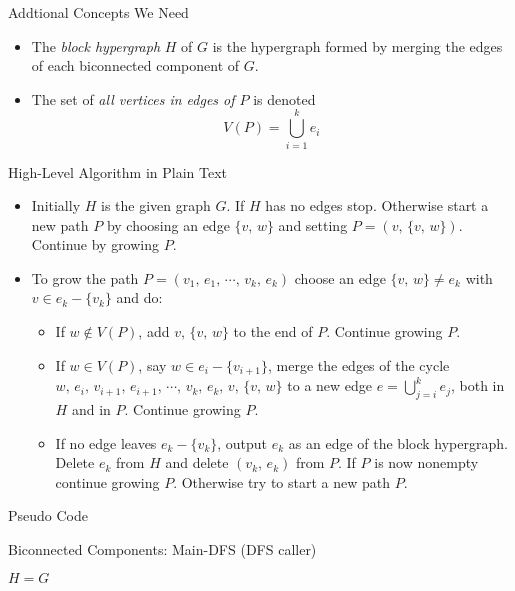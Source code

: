 \documentclass{beamer}
\begin{document}
\begin{frame}{Addtional Concepts We Need}
	\begin{itemize}
		\item
		The \emph{block hypergraph} $H$ of $G$ is the hypergraph formed by merging the edges of each biconnected component of $G$.
		\item
		The set of \emph{all vertices in edges of $P$} is denoted
		$$V(P)=\bigcup_{i=1}^ke_i$$
	\end{itemize}
\end{frame}

\begin{frame}{High-Level Algorithm in Plain Text}
	\begin{itemize}
		\item
		Initially $H$ is the given graph $G$. If $H$ has no edges stop. Otherwise start a new path $P$ by choosing an edge 
		$\{v,\,w\}$ and setting $P=(v,\,\{v,\,w\})$. Continue by growing $P$.
		\item
		To grow the path $P=(v_1,\,e_1,\,\cdots,\,v_k,\,e_k)$ choose an edge $\{v,\,w\}\neq e_k$ with $v\in e_k-\{v_k\}$ and do:
		\begin{itemize}
			\item
			If $w\notin V(P)$, add $v,\,\{v,\,w\}$ to the end of $P$. Continue growing $P$.
			\item
			If $w\in V(P)$, say $w\in e_i-\{v_{i+1}\}$, merge the edges of the cycle $w,\,e_i,\,v_{i+1},\,e_{i+1},\,\cdots,\,v_k,\,e_k,\,v,\,\{v,\,w\}$
			to a new edge $e=\bigcup_{j=i}^ke_j$, both in $H$ and in $P$. Continue growing $P$.
			\item
			If no edge leaves $e_k-\{v_k\}$, output $e_k$ as an edge of the block hypergraph. Delete $e_k$ from $H$ and delete $(v_k,\,e_k)$
			from $P$. If $P$ is now nonempty continue growing $P$. Otherwise try to start a new path $P$.
		\end{itemize}
	\end{itemize}
\end{frame}


\begin{frame}{Pseudo Code}
	\SetAlFnt{\small}
	\begin{algorithm}[H]
		\caption{Biconnected Components: Main-DFS (DFS caller)}
		$H=G$\;
	\end{algorithm}
\end{frame}
\end{document}
